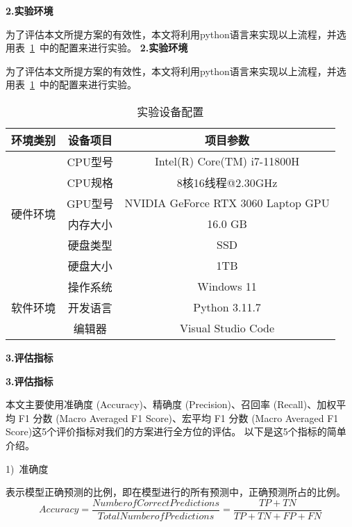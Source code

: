 \textbf{2.实验环境}\par
为了评估本文所提方案的有效性，本文将利用python语言来实现以上流程，并选用表~\ref{tab:env_setting}~中的配置来进行实验。
\textbf{2.实验环境}\par
为了评估本文所提方案的有效性，本文将利用python语言来实现以上流程，并选用表~\ref{tab:env_setting}~中的配置来进行实验。
\begin{table}[htbp]
	\caption{实验设备配置}
	\label{tab:env_setting}
	\centering
	\begin{tabular}{ccc}
		\toprule
		\textbf{环境类别}         & \textbf{设备项目} & \textbf{项目参数}                  \\
		\midrule
		\multirow{6}{*}{硬件环境} & CPU型号           & Intel(R) Core(TM) i7-11800H        \\
		                          & CPU规格           & 8核16线程@2.30GHz                  \\
		                          & GPU型号           & NVIDIA GeForce RTX 3060 Laptop GPU \\
		                          & 内存大小          & 16.0 GB                            \\
		                          & 硬盘类型          & SSD                                \\
		                          & 硬盘大小          & 1TB                                \\
		\hline
		\multirow{3}{*}{软件环境} & 操作系统          & Windows 11                         \\
		                          & 开发语言          & Python 3.11.7                      \\
		                          & 编辑器            & Visual Studio Code                 \\
		\bottomrule
	\end{tabular}
\end{table}

\textbf{3.评估指标}\par
\textbf{3.评估指标}\par
本文主要使用准确度 (Accuracy)、精确度 (Precision)、召回率 (Recall)、加权平均 F1 分数 (Macro Averaged F1 Score)、宏平均 F1 分数 (Macro Averaged F1 Score)这5个评价指标对我们的方案进行全方位的评估。
以下是这5个指标的简单介绍。\par
1)~准确度\par
表示模型正确预测的比例，即在模型进行的所有预测中，正确预测所占的比例。
\begin{equation}
	\label{eq:val_score1}
	Accuracy = \frac{Number of Correct Predictions}{Total Number of Predictions} = \frac{TP + TN}{TP + TN + FP + FN}
\end{equation}

